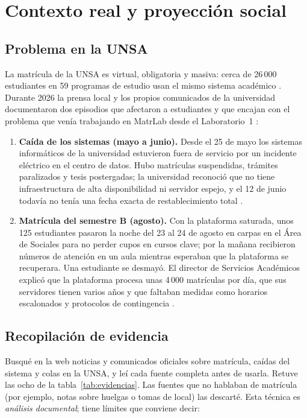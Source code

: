 \section{Contexto real y proyección social}
\label{sec:contexto}

\subsection{Problema en la UNSA}
La matrícula de la UNSA es virtual, obligatoria y masiva: cerca de 26\,000 estudiantes en 59 programas de estudio usan el mismo sistema académico \cite{elpueblo25}. Durante 2026 la prensa local y los propios comunicados de la universidad documentaron dos episodios que afectaron a estudiantes y que encajan con el problema que venía trabajando en MatrLab desde el Laboratorio~1 \cite{lab1}:

\begin{enumerate}
	\item \textbf{Caída de los sistemas (mayo a junio).} Desde el 25 de mayo los sistemas informáticos de la universidad estuvieron fuera de servicio por un incidente eléctrico en el centro de datos. Hubo matrículas suspendidas, trámites paralizados y tesis postergadas; la universidad reconoció que no tiene infraestructura de alta disponibilidad ni servidor espejo, y el 12 de junio todavía no tenía una fecha exacta de restablecimiento total \cite{radiounica,correo}.
	\item \textbf{Matrícula del semestre B (agosto).} Con la plataforma saturada, unos 125 estudiantes pasaron la noche del 23 al 24 de agosto en carpas en el Área de Sociales para no perder cupos en cursos clave; por la mañana recibieron números de atención en un aula mientras esperaban que la plataforma se recuperara. Una estudiante se desmayó. El director de Servicios Académicos explicó que la plataforma procesa unas 4\,000 matrículas por día, que sus servidores tienen varios años y que faltaban medidas como horarios escalonados y protocolos de contingencia \cite{elpueblo24,elpueblo25}.
\end{enumerate}

\subsection{Recopilación de evidencia}
Busqué en la web noticias y comunicados oficiales sobre matrícula, caídas del sistema y colas en la UNSA, y leí cada fuente completa antes de usarla. Retuve las ocho de la tabla~\ref{tab:evidencias}. Las fuentes que no hablaban de matrícula (por ejemplo, notas sobre huelgas o tomas de local) las descarté. Esta técnica es \emph{análisis documental}; tiene límites que conviene decir:

